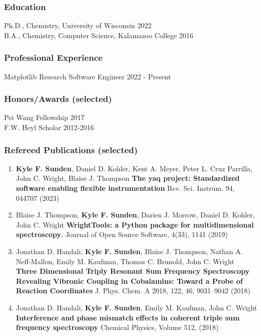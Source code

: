 \documentclass[12pt]{article}
\numberwithin{page}{section}
\begin{document}
\subsubsection*{Education}
Ph.D., Chemistry, University of Wisconsin \hfill 2022\\
B.A., Chemistry, Computer Science, Kalamazoo College \hfill 2016\\

\subsubsection*{Professional Experience}
Matplotlib Research Software Engineer \hfill 2022 - Present\\

\subsubsection*{Honors/Awards (selected)}
Pei Wang Fellowship \hfill 2017\\
F.W. Heyl Scholar \hfill 2012-2016\\

\subsubsection*{Refereed Publications (selected)}

\begin{enumerate}[noitemsep]
  \item \textbf{Kyle F. Sunden}, Daniel D. Kohler, Kent A. Meyer,
    Peter L. Cruz Parrilla, John C. Wright, Blaise J. Thompson
    \textbf{The yaq project: Standardized software enabling flexible instrumentation}
    Rev. Sci. Instrum. 94, 044707 (2023)
  
  \item Blaise J. Thompson, \textbf{Kyle F. Sunden}, Darien J. Morrow,
    Daniel D. Kohler, John C. Wright
    \textbf{WrightTools: a Python package for multidimensional spectroscopy}.
    Journal of Open Source Software, 4(33), 1141 (2019)

  \item Jonathan D. Handali, \textbf{Kyle F. Sunden}, Blaise J. Thompson,
    Nathan A. Neff-Mallon, Emily M. Kaufman, Thomas C. Brunold, John C. Wright
    \textbf{Three Dimensional Triply Resonant Sum Frequency Spectroscopy Revealing
    Vibronic Coupling in Cobalamins: Toward a Probe of Reaction Coordinates}
    J. Phys. Chem. A 2018, 122, 46, 9031–9042 (2018)

  \item Jonathan D. Handali, \textbf{Kyle F. Sunden}, Emily M. Kaufman, John C. Wright
    \textbf{Interference and phase mismatch effects in coherent triple sum frequency spectroscopy}
    Chemical Physics, Volume 512, (2018)

\end{enumerate}
\end{document}
